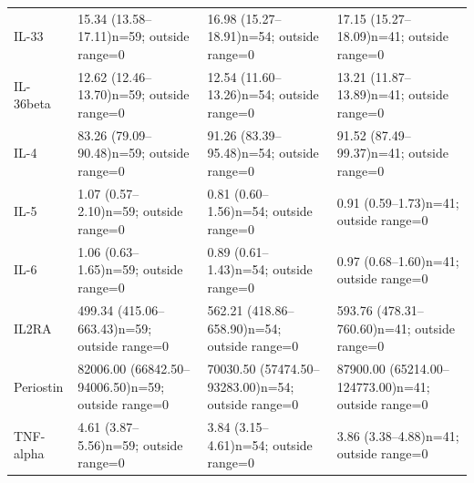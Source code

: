 {\begin{longtable}{p{22mm}p{45mm}p{45mm}p{45mm}}
IL-33 & 15.34 (13.58--17.11)\newline n=59; outside range=0 & 16.98 (15.27--18.91)\newline n=54; outside range=0 & 17.15 (15.27--18.09)\newline n=41; outside range=0 \\[4pt]
IL-36beta & 12.62 (12.46--13.70)\newline n=59; outside range=0 & 12.54 (11.60--13.26)\newline n=54; outside range=0 & 13.21 (11.87--13.89)\newline n=41; outside range=0 \\[4pt]
IL-4 & 83.26 (79.09--90.48)\newline n=59; outside range=0 & 91.26 (83.39--95.48)\newline n=54; outside range=0 & 91.52 (87.49--99.37)\newline n=41; outside range=0 \\[4pt]
IL-5 & 1.07 (0.57--2.10)\newline n=59; outside range=0 & 0.81 (0.60--1.56)\newline n=54; outside range=0 & 0.91 (0.59--1.73)\newline n=41; outside range=0 \\[4pt]
IL-6 & 1.06 (0.63--1.65)\newline n=59; outside range=0 & 0.89 (0.61--1.43)\newline n=54; outside range=0 & 0.97 (0.68--1.60)\newline n=41; outside range=0 \\[4pt]
IL2RA & 499.34 (415.06--663.43)\newline n=59; outside range=0 & 562.21 (418.86--658.90)\newline n=54; outside range=0 & 593.76 (478.31--760.60)\newline n=41; outside range=0 \\[4pt]
Periostin & 82006.00 (66842.50--94006.50)\newline n=59; outside range=0 & 70030.50 (57474.50--93283.00)\newline n=54; outside range=0 & 87900.00 (65214.00--124773.00)\newline n=41; outside range=0 \\[4pt]
TNF-alpha & 4.61 (3.87--5.56)\newline n=59; outside range=0 & 3.84 (3.15--4.61)\newline n=54; outside range=0 & 3.86 (3.38--4.88)\newline n=41; outside range=0 \\[4pt]

\end{longtable}}

